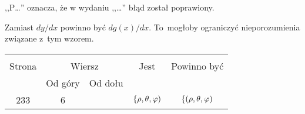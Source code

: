 \documentclass[a4paper,11pt]{article}
\begin{document}









,,P\ldots'' oznacza, że w wydaniu ,,\ldots'' błąd został poprawiony.\\







\start {} Zamiast $dy/dx$ powinno być $d g( x )/dx$.
To~mogłoby ograniczyć nieporozumienia związane z~tym wzorem.

\begin{center}
  \begin{tabular}{|c|c|c|c|c|}
    \hline
    & \multicolumn{2}{c|}{} & & \\
    Strona & \multicolumn{2}{c|}{Wiersz} & Jest
                              & Powinno być \\ \cline{2-3}
    & Od góry & Od dołu & & \\
    \hline
    233 &  6 & & $\{\rho, \theta, \varphi)$ & $\{ ( \rho, \theta, \varphi )$ \\
    \hline
  \end{tabular}
\end{center}

\vspace{\spaceTwo}















\end{document}
